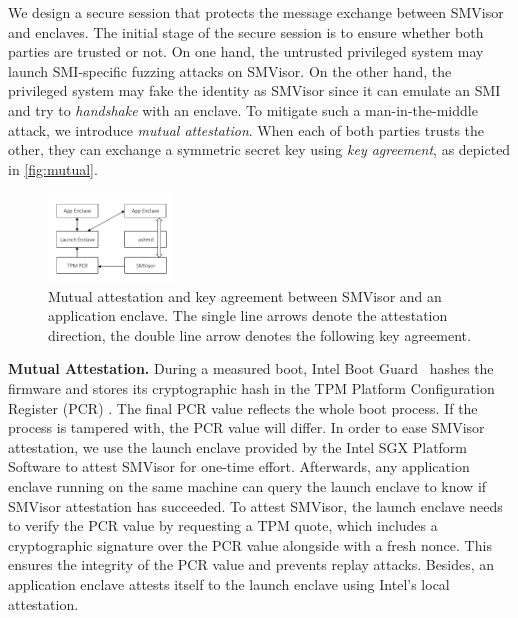 \documentclass[journal,twocolumn,letterpaper,10pt]{IEEEtran}
\begin{document}
We design a secure session that protects the message exchange between SMVisor and enclaves. 
The initial stage of the secure session is to ensure whether both parties are trusted or not. On one hand, the untrusted privileged system may launch SMI-specific fuzzing attacks on  SMVisor. On the other hand, the privileged system may fake the identity as  SMVisor since it can emulate an SMI and try to \textit{handshake} with an enclave. To mitigate such a man-in-the-middle attack, we introduce \textit{mutual attestation}. When each of both parties trusts the other, they can exchange a symmetric secret key using \textit{key agreement}, as depicted in \autoref{fig:mutual}. %

\begin{figure}[t]
\centering
\includegraphics[width=0.3\textwidth]{figures/mutual.pdf}%
\caption{Mutual attestation and key agreement between SMVisor and an application enclave. The single line arrows denote the attestation direction, the double line arrow denotes the following key agreement.}
\label{fig:mutual}
\end{figure}

\textbf{Mutual Attestation.}
During a measured boot, Intel Boot Guard~\cite{ruan_platform_2014} hashes the firmware and stores its cryptographic hash in the TPM Platform Configuration Register (PCR) \cite{tcg_trusted_2014}. The final PCR value reflects the whole boot process. If the process is tampered with, the PCR value will differ. In order to ease SMVisor attestation, we use the launch enclave provided by the Intel SGX Platform Software to attest SMVisor for one-time effort. Afterwards, any application enclave running on the same machine can query the launch enclave to know if SMVisor attestation has succeeded. To attest  SMVisor, the launch enclave needs to verify the PCR value by requesting a TPM quote, which includes a cryptographic signature over the PCR value alongside with a fresh nonce. This ensures the integrity of the PCR value and prevents replay attacks. Besides, an application enclave attests itself to the launch enclave using Intel's local attestation.
\end{document}
